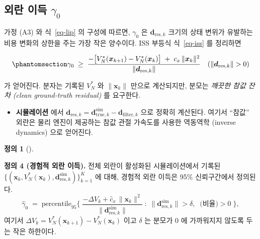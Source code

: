 \documentclass[
  11pt,
]{article}
\providecommand{\tightlist}{%
  \setlength{\itemsep}{0pt}\setlength{\parskip}{0pt}}
\theoremstyle{plain}
\theoremstyle{plain}
\theoremstyle{definition}
\newtheorem{definition}{정의}[section]
\theoremstyle{remark}
\begin{document}
\subsection{\texorpdfstring{외란 이득
\(\gamma_0\)}{외란 이득 \textbackslash gamma\_0}}\label{sec-estim-gamma}

가정 (A3) 와 식~\ref{eq-lip} 의 구성에 따르면, \(\gamma_0\) 은
\(\bm{d}_{\mathrm{res},k}\) 크기의 상태 변위가 유발하는 비용 변화의
상한을 주는 가장 작은 양수이다. ISS 부등식 식~\ref{eq-iss} 를 정리하면

\begin{equation}\protect\phantomsection\label{eq-gamma-defn}{
\gamma_0 \;\ge\;
\frac{-\bigl[V_N^*(\bm{x}_{k+1}) - V_N^*(\bm{x}_k)\bigr]
       \;+\; c_x\,\|\bm{x}_k\|^2}
     {\|\bm{d}_{\mathrm{res},k}\|}
\quad (\|\bm{d}_{\mathrm{res},k}\| > 0)
}\end{equation}

가 얻어진다. 분자는 기록된 \(V_N^*\) 와 \(\|\bm{x}_k\|\) 만으로
계산되지만, 분모는 \emph{깨끗한 참값 잔차 (clean ground-truth residual)}
를 요구한다.

\begin{itemize}
\tightlist
\item
  \textbf{시뮬레이션} 에서
  \(\bm{d}_{\mathrm{res},k} = \bm{d}_{\mathrm{true},k}^{\mathrm{sim}}
  - \bm{d}_{\mathrm{filter},k}\) 으로 정확히 계산된다. 여기서 ``참값''
  외란은 물리 엔진이 제공하는 참값 관절 가속도를 사용한 역동역학
  (inverse dynamics) 으로 얻어진다.
\end{itemize}

\begin{definition}[]\protect\hypertarget{def-gamma-emp}{}\label{def-gamma-emp}

\textbf{정의 4 (경험적 외란 이득).} 전체 외란이 활성화된 시뮬레이션에서
기록된
\(\{(\bm{x}_k, V_N^*(\bm{x}_k), \bm{d}_{\mathrm{res},k}^{\mathrm{sim}})\}_{k=1}^{K}\)
에 대해, 경험적 외란 이득은 95\% 신뢰구간에서 정의된다. \[
\hat{\gamma}_0 \;=\;
\mathrm{percentile}_{95}\!\Biggl\{\;
\frac{-\Delta V_k + \hat{c}_x\,\|\bm{x}_k\|^2}
     {\|\bm{d}_{\mathrm{res},k}^{\mathrm{sim}}\|}
\;:\;
\|\bm{d}_{\mathrm{res},k}^{\mathrm{sim}}\| > \delta,
\;\;\text{(비율)} > 0
\;\Biggr\},
\] 여기서 \(\Delta V_k = V_N^*(\bm{x}_{k+1}) - V_N^*(\bm{x}_k)\) 이고
\(\delta\) 는 분모가 0 에 가까워지지 않도록 두는 작은 하한이다.

\end{definition}
\end{document}
